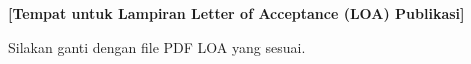 \clearpage
{}
\label{appendix:loa_publikasi}

%
% 

\begin{center}
\vspace{3cm}
{\large\bfseries [Tempat untuk Lampiran Letter of Acceptance (LOA) Publikasi]}

\vspace{1cm}
Silakan ganti dengan file PDF LOA yang sesuai.
\end{center}
